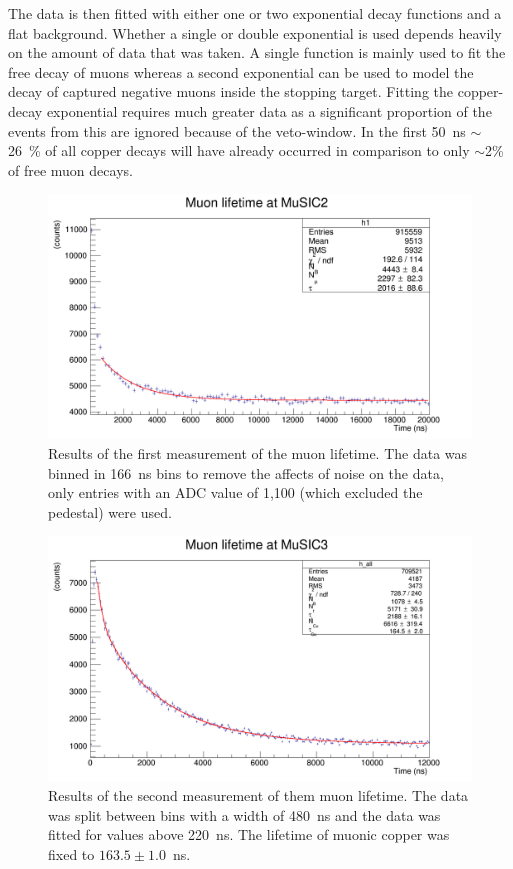 The data is then fitted with either one or two exponential decay functions and a flat background. Whether a single or double exponential is used depends heavily on the amount of data that was taken. A single function is mainly used to fit the free decay of muons whereas a second exponential can be used to model the decay of captured negative muons inside the stopping target. Fitting the copper-decay exponential requires much greater data as a significant proportion of the events from this are ignored because of the veto-window. In the first 50~ns \(\sim\)26~\% of all copper decays will have already occurred in comparison to only \(\sim\)2\% of free muon decays. 

\begin{figure}[hptb]
    \centering
        \includegraphics[width=.9\textwidth]{images/lifetime/music2_mu_lifetime_good.png}
    \caption{Results of the first measurement of the muon lifetime. The data was binned in 166~ns bins to remove the affects of noise on the data, only entries with an ADC value of 1,100 (which excluded the pedestal) were used.}
    \label{fig:music2_mu_lifetime}
\end{figure}
\begin{figure}[hptb]
    \centering
        \includegraphics[width=.9\textwidth]{images/lifetime/music3_muon_lifetime.png}
    \caption{Results of the second measurement of them muon lifetime. The data was split between bins with a width of 480~ns and the data was fitted for values above 220~ns. The lifetime of muonic copper was fixed to \( 163.5\pm1.0 \)~ns.}
    \label{fig:music3_muon_lifetime}
\end{figure}

